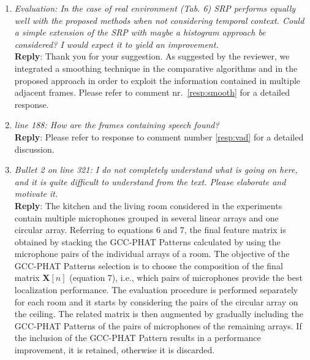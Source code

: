 \documentclass[11pt, technote, letterpaper, oneside, onecolumn]{IEEEtran}
\begin{document}
\begin{enumerate}
\item \textit{Evaluation: In the case of real environment (Tab. 6) SRP performs equally well with the proposed methods when not considering temporal context. Could a simple extension of the SRP with maybe a histogram approach be considered? I would expect it to yield an improvement.\\}
\textbf{Reply}: Thank you for your suggestion. As suggested by the reviewer, we integrated a smoothing technique in the comparative algorithms and in the proposed approach in order to exploit the information contained in multiple adjacent frames. Please refer to comment nr.\ \ref{resp:smooth} for a detailed response.


\item \textit{line 188: How are the frames containing speech found?\\}
\textbf{Reply}: Please refer to response to comment number \ref{resp:vad} for a detailed discussion.

\item \textit{Bullet 2 on line 321: I do not completely understand what is going on here, and it is quite difficult to understand from the text. Please elaborate and motivate it.\\}
\textbf{Reply}: The kitchen and the living room considered in the experiments contain multiple microphones grouped in several linear arrays and one circular array. Referring to equations 6 and 7, the final feature matrix is obtained by stacking the GCC-PHAT Patterns calculated by using the microphone pairs of the individual arrays of a room. The objective of the GCC-PHAT Patterns selection is to choose the composition of the final matrix $\mathbf{X}[n]$ (equation 7), i.e., which pairs of microphones provide the best localization performance. The evaluation procedure is performed separately for each room and it starts by considering the pairs of the circular array on the ceiling. The related matrix is then augmented by gradually including the GCC-PHAT Patterns of the pairs of microphones of the remaining arrays. If the inclusion of the GCC-PHAT Pattern results in a performance improvement, it is retained, otherwise it is discarded. %


\end{enumerate}
\end{document}
